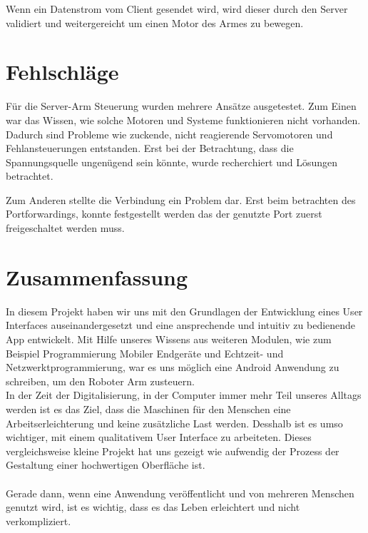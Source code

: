 \documentclass[12pt,					%
							 oneside,			%
							 a4paper,			%
							 halfparskip,		%
							 liststotoc,			%
							 bibtotoc,			%
							 fleqn,				%
							 pointlessnumbers]	%
							 {scrreprt}
\begin{document}
Wenn ein Datenstrom vom Client gesendet wird, wird dieser durch den Server validiert und weitergereicht um einen Motor des Armes zu bewegen.


\chapter{Fehlschläge}
Für die Server-Arm Steuerung wurden mehrere Ansätze ausgetestet. Zum Einen war das Wissen, wie solche Motoren und Systeme funktionieren nicht vorhanden. Dadurch sind Probleme wie zuckende, nicht reagierende Servomotoren und Fehlansteuerungen entstanden. Erst bei der Betrachtung, dass die Spannungsquelle ungenügend sein könnte, wurde recherchiert\cite{I2C} und Lösungen betrachtet. 

Zum Anderen stellte die Verbindung ein Problem dar. Erst beim betrachten des Portforwardings, konnte festgestellt werden das der genutzte Port zuerst freigeschaltet werden muss.
\chapter{Zusammenfassung}	
In diesem Projekt haben wir uns mit den Grundlagen der Entwicklung eines User Interfaces auseinandergesetzt und eine ansprechende und intuitiv zu bedienende App entwickelt. Mit Hilfe unseres Wissens aus weiteren Modulen, wie zum Beispiel \glqq{}Programmierung Mobiler Endgeräte\grqq{} und \glqq{}Echtzeit- und Netzwerktprogrammierung\grqq{}, war es uns möglich eine Android Anwendung zu schreiben, um den Roboter Arm zusteuern. 
\\
In der Zeit der Digitalisierung, in der Computer immer mehr Teil unseres Alltags werden ist es das Ziel, dass die Maschinen für den Menschen eine Arbeitserleichterung und keine zusätzliche Last werden. Desshalb ist es umso wichtiger, mit einem qualitativem User Interface zu arbeiteten. Dieses vergleichsweise kleine Projekt hat uns gezeigt wie aufwendig der Prozess der Gestaltung einer hochwertigen Oberfläche ist.\\ \\
Gerade dann, wenn eine Anwendung veröffentlicht und von mehreren Menschen genutzt wird, ist es wichtig, dass es das Leben erleichtert und nicht verkompliziert.
\end{document}
